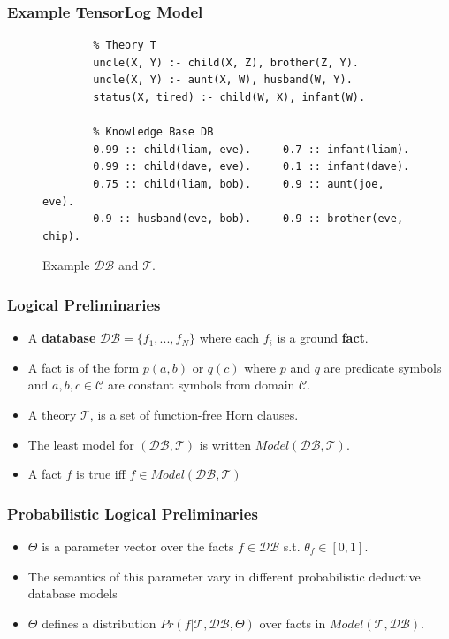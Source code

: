 \documentclass{beamer}
\begin{document}
\begin{frame}[fragile]
\frametitle{Example TensorLog Model}
\begin{figure}
	\begin{center}
		\begin{verbatim}
		% Theory T
		uncle(X, Y) :- child(X, Z), brother(Z, Y).
		uncle(X, Y) :- aunt(X, W), husband(W, Y).
		status(X, tired) :- child(W, X), infant(W).
		
		% Knowledge Base DB
		0.99 :: child(liam, eve).     0.7 :: infant(liam).
		0.99 :: child(dave, eve).     0.1 :: infant(dave).
		0.75 :: child(liam, bob).     0.9 :: aunt(joe, eve).
		0.9 :: husband(eve, bob).     0.9 :: brother(eve, chip).
		\end{verbatim}
	\end{center}
	\caption{Example $\mathcal{DB}$ and $\mathcal{T}$.}
\end{figure}
\end{frame}

\begin{frame}
\frametitle{Logical Preliminaries}
\begin{itemize}
	\item A \textbf{database} $\mathcal{DB} = \{f_1, ..., f_N \}$ where each $f_i$ is a ground \textbf{fact}.
	\item A fact is of the form $p(a, b)$ or $q(c)$ where $p$ and $q$ are predicate symbols and $a, b, c \in \mathcal{C}$ are constant symbols from domain $\mathcal{C}$.
	\item A theory $\mathcal{T}$, is a set
	of function-free Horn clauses.
	\item The least model for $(\mathcal{DB}, \mathcal{T})$ is written $Model(\mathcal{DB}, \mathcal{T})$.
	\item A fact $f$ is true iff $f \in Model(\mathcal{DB}, \mathcal{T})$
\end{itemize}
\end{frame}

\begin{frame}
\frametitle{Probabilistic Logical Preliminaries}
\begin{itemize}
	\item $\Theta$ is a parameter vector over the facts $f \in \mathcal{DB}$ s.t. $\theta_f \in [0,1]$.
	\item The semantics of this parameter
	vary in different probabilistic deductive database models
	\item $\Theta$ defines a distribution $Pr(f | \mathcal{T}, \mathcal{DB}, \Theta)$ over facts in $Model(\mathcal{T}, \mathcal{DB})$.
\end{itemize}
\end{frame}
\end{document}
